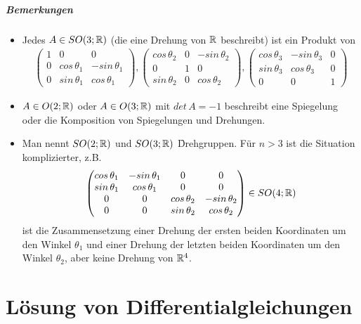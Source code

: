 \paragraph{Bemerkungen}
\begin{itemize}
\item Jedes $A \in SO(3; \mathbb{R})$ (die eine Drehung von $\mathbb{R}$ beschreibt) ist ein Produkt von 
\begin{align}
\begin{pmatrix} 1 & 0 & 0 \\ 0 & cos\, \theta_1 & -sin\, \theta_1 \\ 0 & sin\, \theta_1 & cos\, \theta_1 \end{pmatrix}, \begin{pmatrix} cos\, \theta_2 & 0 & -sin\, \theta_2 \\ 0 & 1 & 0 \\ sin\, \theta_2 & 0 & cos\, \theta_2 \end{pmatrix}, \begin{pmatrix} cos\, \theta_3 & -sin\, \theta_3 & 0 \\ sin\, \theta_3 & cos\, \theta_3 & 0 \\ 0 & 0 & 1 \end{pmatrix}
\end{align}
\item $A \in O(2; \mathbb{R})$ oder $A \in O(3; \mathbb{R})$ mit $det\, A = -1$ beschreibt eine Spiegelung oder die Komposition von Spiegelungen und Drehungen.
\item Man nennt $SO(2; \mathbb{R})$ und $SO(3; \mathbb{R})$ \f{Drehgruppen}. Für $n > 3$ ist die Situation komplizierter, z.B.
\begin{align}
\begin{pmatrix} cos\, \theta_1 & -sin\, \theta_1 & 0 & 0 \\ sin\, \theta_1 & cos\, \theta_1 & 0 & 0 \\ 0 & 0 & cos\, \theta_2 & -sin\, \theta_2 \\ 0 & 0 & sin\, \theta_2 & cos\, \theta_2\end{pmatrix} \in SO(4; \mathbb{R})
\end{align}
ist die Zusammensetzung einer Drehung der ersten beiden Koordinaten um den Winkel $\theta_1$ und einer Drehung der letzten beiden Koordinaten um den Winkel $\theta_2$, aber keine Drehung von $\mathbb{R}^4$.
\end{itemize}

\chapter{Lösung von Differentialgleichungen} %
\label{chapter4}
